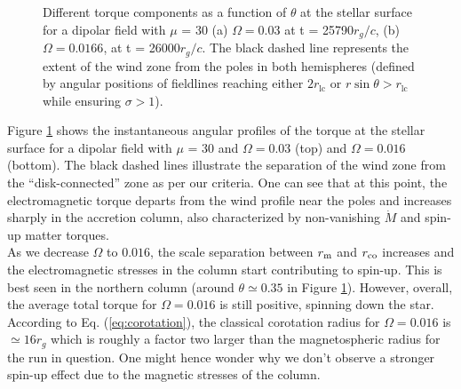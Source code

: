 \documentclass[fleqn,usenatbib]{mnras}
\begin{document}
\begin{figure}
   \centering
    \caption{Different torque components as a function of $\theta$ at the stellar surface for a dipolar field with $\mu$ = 30 (a) $\Omega = 0.03$ at t = 25790$r_g/c$, (b) $\Omega = 0.0166$, at t = 26000$r_g/c$. The black dashed line represents the extent of the wind zone from the poles in both hemispheres (defined by angular positions of fieldlines reaching either $2r_{\text{lc}}$ or $r \sin\theta > r_{\text{lc}}$ while ensuring $\sigma > 1$).}
    \label{fig:mu30-om0p0166-om0p03}
\end{figure}

Figure \ref{fig:mu30-om0p0166-om0p03} shows the instantaneous angular profiles of the  torque at the stellar surface for a dipolar field with $\mu$ = 30 and $\Omega=0.03$ (top) and $\Omega=0.016$ (bottom). The black dashed lines illustrate the separation of the wind zone from the ``disk-connected'' zone as per our criteria.  One can see that at this point, the electromagnetic torque departs from the wind profile near the poles and increases sharply in the accretion column, also characterized by non-vanishing $\dot{M}$ and spin-up matter torques.   \\
As we decrease $\Omega$ to $0.016$, the scale separation between $r_{\rm m}$ and $r_{\rm co}$ increases and the electromagnetic stresses in the column start contributing to spin-up.  This is best seen in the northern column (around $\theta\simeq0.35$ in Figure \ref{fig:mu30-om0p0166-om0p03}).  
However, overall, the average total torque for $\Omega = 0.016$ is still positive, spinning down the star. 
According to Eq. (\ref{eq:corotation}), the classical corotation radius for $\Omega = 0.016$ is $\simeq 16r_g$ which is roughly a factor two larger than the magnetospheric radius for the run in question.  One might hence wonder why we don't observe a stronger spin-up effect due to the magnetic stresses of the column.  
\end{document}
